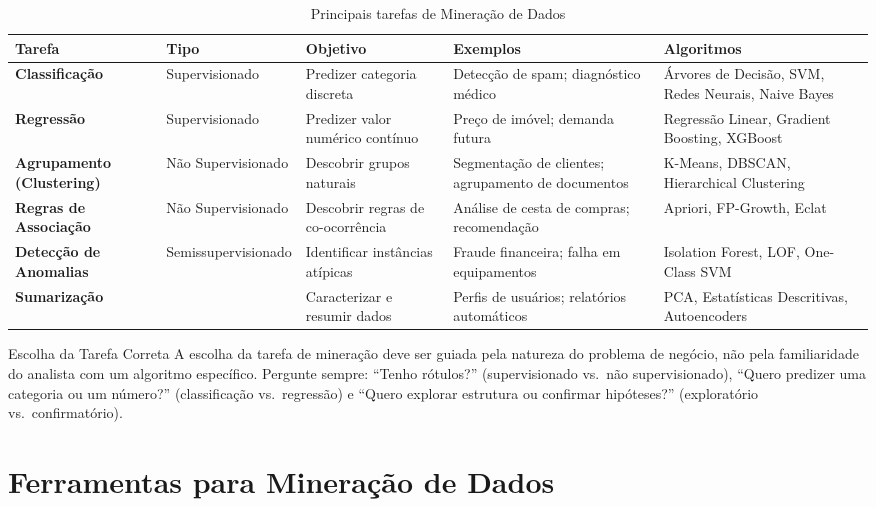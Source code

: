 \documentclass[12pt,a4paper]{article}
\begin{document}
\begin{table}[ht]
\centering
\caption{Principais tarefas de Mineração de Dados}
\label{tab:tarefas}
\small
\begin{tabular}{>{\bfseries}p{2.4cm} p{2.0cm} p{2.5cm} p{2.5cm} p{3.5cm}}
\toprule
\textbf{Tarefa} & \textbf{Tipo} & \textbf{Objetivo} & \textbf{Exemplos} & \textbf{Algoritmos} \\
\midrule
Classificação & Supervisionado & Predizer categoria discreta & Detecção de spam; diagnóstico médico & Árvores de Decisão, SVM, Redes Neurais, Naive Bayes \\
\midrule
Regressão & Supervisionado & Predizer valor numérico contínuo & Preço de imóvel; demanda futura & Regressão Linear, Gradient Boosting, XGBoost \\
\midrule
Agrupamento (Clustering) & Não Supervisionado & Descobrir grupos naturais & Segmentação de clientes; agrupamento de documentos & K-Means, DBSCAN, Hierarchical Clustering \\
\midrule
Regras de Associação & Não Supervisionado & Descobrir regras de co-ocorrência & Análise de cesta de compras; recomendação & Apriori, FP-Growth, Eclat \\
\midrule
Detecção de Anomalias & Semissupervisionado & Identificar instâncias atípicas & Fraude financeira; falha em equipamentos & Isolation Forest, LOF, One-Class SVM \\
\midrule
Sumarização & & Caracterizar e resumir dados & Perfis de usuários; relatórios automáticos & PCA, Estatísticas Descritivas, Autoencoders \\
\bottomrule
\end{tabular}
\end{table}

\begin{dicabox}{Escolha da Tarefa Correta}
A escolha da tarefa de mineração deve ser guiada pela natureza do problema de negócio, não pela familiaridade do analista com um algoritmo específico. Pergunte sempre: ``Tenho rótulos?'' (supervisionado vs.\ não supervisionado), ``Quero predizer uma categoria ou um número?'' (classificação vs.\ regressão) e ``Quero explorar estrutura ou confirmar hipóteses?'' (exploratório vs.\ confirmatório).
\end{dicabox}

\section{Ferramentas para Mineração de Dados}
\end{document}
